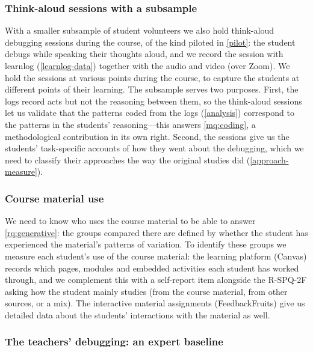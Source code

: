 \subsubsection{Think-aloud sessions with a subsample}
\label{think-aloud}

With a smaller subsample of student volunteers we also hold think-aloud
debugging sessions during the course, of the kind piloted in \cref{pilot}:
the student debugs while speaking their thoughts aloud, and we record the
session with learnlog (\cref{learnlog-data}) together with the audio and
video (over Zoom).
We hold the sessions at various points during the course, to capture the
students at different points of their learning.
The subsample serves two purposes.
First, the logs record acts but not the reasoning between them, so the
think-aloud sessions let us validate that the patterns coded from the logs
(\cref{analysis}) correspond to the patterns in the students'
reasoning---this answers \cref{mq:coding}, a methodological contribution
in its own right.
Second, the sessions give us the students' task-specific accounts of how
they went about the debugging, which we need to classify their approaches
the way the original studies did (\cref{approach-measure}).

\subsubsection{Course material use}
\label{material-use}

We need to know who uses the course material to be able to answer
\cref{rq:generative}: the groups compared there are defined by whether the
student has experienced the material's patterns of variation.
To identify these groups we measure each student's use
of the course material: the learning platform (Canvas) records which pages,
modules and embedded activities each student has worked through, and we
complement this with a self-report item alongside the R-SPQ-2F asking how the
student mainly studies (from the course material, from other sources, or a
mix).
The interactive material assignments (FeedbackFruits) give us detailed data
about the students' interactions with the material as well.

\subsubsection{The teachers' debugging: an expert baseline}
\label{teacher-baseline}

